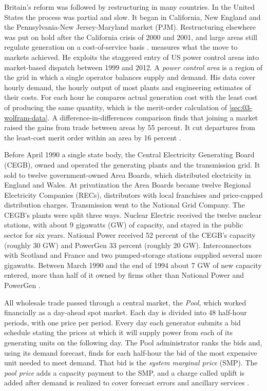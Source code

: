 Britain's reform was followed by restructuring in many countries. In the United States the process was partial and
slow. It began in California, New England and the Pennsylvania-New Jersey-Maryland market (PJM). Restructuring
elsewhere was put on hold after the California crisis of 2000 and 2001, and large areas still regulate generation on
a cost-of-service basis \citep[p.~688]{KelloggReguant2021}. \citet{Cicala2020} measures what the move to markets
achieved. He exploits the staggered entry of US power control areas into market-based dispatch between 1999 and 2012. A
\emph{power control area} is a region of the grid in which a single operator balances supply and demand.
His data cover hourly demand, the hourly output of most plants and engineering estimates of their costs. For each
hour he compares actual generation cost with the least cost of producing the same quantity, which is the merit-order
calculation of \cref{sec:03-wolfram-data}. A difference-in-differences comparison finds that joining a market raised
the gains from trade between areas by 55 percent. It cut departures from the least-cost merit order within an area by
16 percent \citep[p.~689]{KelloggReguant2021}.

Before April 1990 a single state body, the Central Electricity Generating Board (CEGB), owned and operated the
generating plants and the transmission grid. It sold to twelve government-owned Area Boards, which distributed
electricity in England and Wales. At privatization the Area Boards became twelve Regional Electricity Companies
(RECs), distributors with local franchises and price-capped distribution charges. Transmission went to the National
Grid Company. The CEGB's plants were split three ways. Nuclear Electric received the twelve nuclear stations, with
about 9 gigawatts (GW) of capacity, and stayed in the public sector for six years. National Power received 52 percent
of the CEGB's capacity (roughly 30 GW) and PowerGen 33 percent (roughly 20 GW). Interconnectors with Scotland and
France and two pumped-storage stations supplied several more gigawatts. Between March 1990 and the end of 1994 about
7 GW of new capacity entered, more than half of it owned by firms other than National Power and PowerGen
\citep[pp.~806--807]{Wolfram1999}.

All wholesale trade passed through a central market, the \emph{Pool}, which worked financially as a day-ahead spot
market. Each day is divided into 48 half-hour periods, with one price per period. Every day each generator submits a
bid schedule stating the prices at which it will supply power from each of its generating units on the following day.
The Pool administrator ranks the bids and, using its demand forecast, finds for each half-hour the bid of the most
expensive unit needed to meet demand. That bid is the \emph{system marginal price} (SMP). The \emph{pool price} adds a
capacity payment to the SMP, and a charge called uplift is added after demand is realized to cover forecast errors and
ancillary services \citep[p.~807 and n.~7]{Wolfram1999}.

